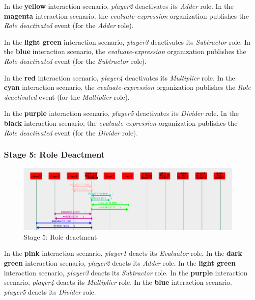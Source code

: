 In the \textbf{yellow} interaction scenario, \textit{player2} deactivates its \textit{Adder} role.
In the \textbf{magenta} interaction scenario, the \textit{evaluate-expression} organization publishes the \textit{Role deactivated} event (for the \textit{Adder} role).

In the \textbf{light green} interaction scenario, \textit{player3} deactivates its \textit{Subtractor} role.
In the \textbf{blue} interaction scenario, the \textit{evaluate-expression} organization publishes the \textit{Role deactivated} event (for the \textit{Subtractor} role).

In the \textbf{red} interaction scenario, \textit{player4} deactivates its \textit{Multiplier} role.
In the \textbf{cyan} interaction scenario, the \textit{evaluate-expression} organization publishes the \textit{Role deactivated} event (for the \textit{Multiplier} role).

In the \textbf{purple} interaction scenario, \textit{player5} deactivates its \textit{Divider} role.
In the \textbf{black} interaction scenario, the \textit{evaluate-expression} organization publishes the \textit{Role deactivated} event (for the \textit{Divider} role).

\subsubsection*{Stage 5: Role Deactment}

\begin{figure}[H]
	\centering
	\includegraphics[width=\textwidth]{images/examples/example2-stage5.png}
	\caption{Stage 5: Role deactment}
	\label{figure:example2-stage5}
\end{figure} 

In the \textbf{pink} interaction scenario, \textit{player1} deacts its \textit{Evaluator} role.
In the \textbf{dark green} interaction scenario, \textit{player2} deacts its \textit{Adder} role.
In the \textbf{light green} interaction scenario, \textit{player3} deacts its \textit{Subtractor} role.
In the \textbf{purple} interaction scenario, \textit{player4} deacts its \textit{Multiplier} role.
In the \textbf{blue} interaction scenario, \textit{player5} deacts its \textit{Divider} role.